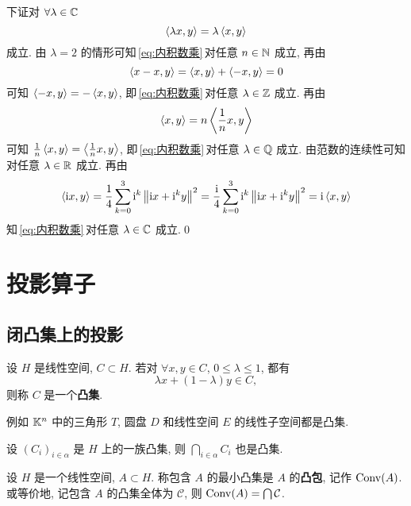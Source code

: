 \begin{Proof}
        下证对 $ \forall\lambda\in\mathbb{C} $
        \begin{equation}\label{eq:内积数乘}
            \left\langle \lambda x, y \right\rangle=\lambda\left\langle x, y \right\rangle
        \end{equation}
        成立. 由 $ \lambda=2 $ 的情形可知\,\eqref{eq:内积数乘}\,对任意 $ n\in\mathbb{N} $ 成立, 再由
        \[
            \left\langle x-x, y \right\rangle=\left\langle x, y \right\rangle+\left\langle -x, y \right\rangle=0
        \]
        可知 $ \left\langle -x, y \right\rangle=-\left\langle x, y \right\rangle $, 即\,\eqref{eq:内积数乘}\,对任意 $ \lambda\in\mathbb{Z} $ 成立. 再由
        \[
            \left\langle x, y \right\rangle=n\left\langle \frac{1}{n}x, y \right\rangle
        \]
        可知 $ \frac{1}{n}\left\langle x, y \right\rangle=\left\langle \frac{1}{n}x, y \right\rangle $, 即\,\eqref{eq:内积数乘}\,对任意 $ \lambda\in\mathbb{Q} $ 成立. 由范数的连续性可知对任意 $ \lambda\in\mathbb{R} $ 成立. 再由
        \[
            \left\langle \mathrm{i} x, y \right\rangle=\frac{1}{4}\sum_{k=0}^{3}\mathrm{i}^{k}\left\| \mathrm{i} x+\mathrm{i}^{k}y \right\|^{2}=\frac{\mathrm{i}}{4}\sum_{k=0}^{3}\mathrm{i}^{k}\left\| \mathrm{i} x+\mathrm{i}^{k}y \right\|^{2}=\mathrm{i}\left\langle x, y \right\rangle
        \]
        知\,\eqref{eq:内积数乘}\,对任意 $ \lambda\in\mathbb{C} $ 成立.\qed
    \end{Proof}

\section{投影算子}
    \subsection{闭凸集上的投影}
    
    \begin{Definition}[凸集]\label{def:凸集}
        设 $ H $ 是线性空间, $ C\subset H $. 若对 $ \forall x, y\in C $, $ 0\leqslant\lambda\leqslant1 $, 都有
        \[
            \lambda x+(1-\lambda)y\in C,
        \]
        则称 $ C $ 是一个\textbf{凸集}.
    \end{Definition}
    例如 $ \mathbb{K}^{n} $ 中的三角形 $ T $, 圆盘 $ D $ 和线性空间 $ E $ 的线性子空间都是凸集.
    
    \begin{Proposition}
        设 $ (C_{i})_{i\in\alpha} $ 是 $ H $ 上的一族凸集, 则 $ \bigcap_{i\in\alpha}C_{i} $ 也是凸集.
    \end{Proposition}

    \begin{Definition}[凸包]\label{def:凸包}
         设 $ H $ 是一个线性空间, $ A\subset H $. 称包含 $ A $ 的最小凸集是 $ A $ 的\textbf{凸包}, 记作 $ \operatorname{Conv}(A) $. 或等价地, 记包含 $ A $ 的凸集全体为 $ \mathcal{C} $, 则 $ \operatorname{Conv}(A)=\bigcap \mathcal{C} $. 
    \end{Definition}

